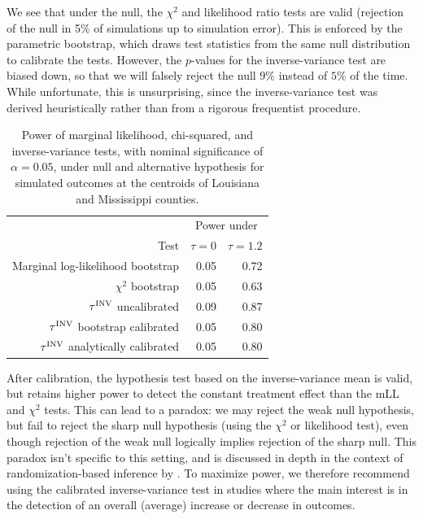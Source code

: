 	We see that under the null, the \(\chi^2\) and likelihood ratio tests are valid (rejection of the null in 5\% of simulations up to simulation error).
This is enforced by the parametric bootstrap, which draws test statistics from the same null distribution to calibrate the tests.
However, the \(p\)-values for the inverse-variance test are biased down, so that we will falsely reject the null \(9\%\) instead of \(5\%\) of the time.
While unfortunate, this is unsurprising, since the inverse-variance test was derived heuristically rather than from a rigorous frequentist procedure.

\begin{table}
    \centering
    \bgroup
    \def\arraystretch{1.1}%
    \centering
    \begin{tabular}{rrr}
        \hline
        & \multicolumn{2}{c}{Power under} \\
        Test & \(\tau=0\) & \(\tau=1.2\) \\
        \hline
	    Marginal log-likelihood bootstrap & 0.05 & 0.72 \\
	    \(\chi^2\) bootstrap & 0.05 & 0.63 \\
	    \(\tau^{\mathrm{INV}}\) uncalibrated & 0.09 & 0.87 \\
	    \(\tau^{\mathrm{INV}}\) bootstrap calibrated & 0.05 & 0.80 \\
	    \(\tau^{\mathrm{INV}}\) analytically calibrated & 0.05 & 0.80 \\
        \hline
    \end{tabular}
    \egroup
    \caption{
		Power of marginal likelihood, chi-squared, and inverse-variance tests, with nominal significance of \(\alpha=0.05\), under null and alternative hypothesis for simulated outcomes at the centroids of Louisiana and Mississippi counties.
    	\label{table:power}
	}
\end{table}

	After calibration, the hypothesis test based on the inverse-variance mean is valid, but retains higher power to detect the constant treatment effect than the mLL and \(\chi^2\) tests.
This can lead to a paradox: we may reject the weak null hypothesis, but fail to reject the sharp null hypothesis (using the \(\chi^2\) or likelihood test), even though rejection of the weak null logically implies rejection of the sharp null.
This paradox isn't specific to this setting, and is discussed in depth in the context of randomization-based inference by \cite{Ding:2014sf}.
To maximize power, we therefore recommend using the calibrated inverse-variance test in studies where the main interest is in the detection of an overall (average) increase or decrease in outcomes.

